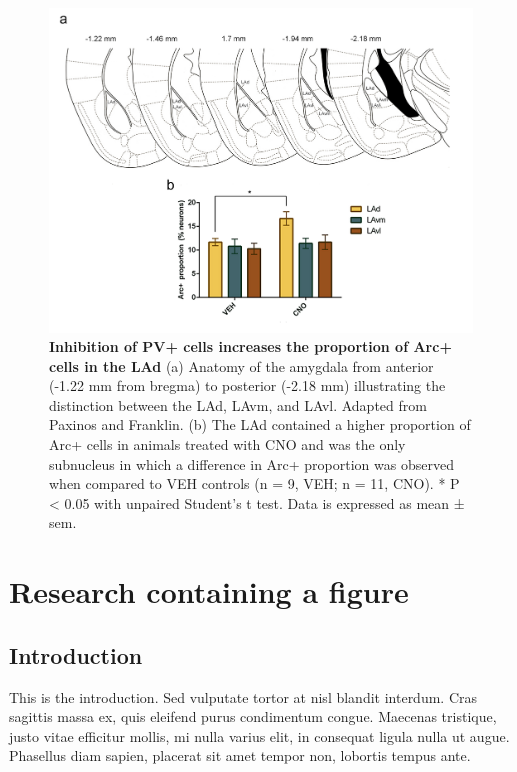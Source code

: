 \documentclass[12pt,a4paperpaper,]{report}
\begin{document}
\begin{figure}[htbp]
\centering
\includegraphics{source/figures/figure_5.jpg}
\caption{\textbf{Inhibition of PV+ cells increases the proportion of
Arc+ cells in the LAd} (a) Anatomy of the amygdala from anterior (-1.22
mm from bregma) to posterior (-2.18 mm) illustrating the distinction
between the LAd, LAvm, and LAvl. Adapted from Paxinos and Franklin. (b)
The LAd contained a higher proportion of Arc+ cells in animals treated
with CNO and was the only subnucleus in which a difference in Arc+
proportion was observed when compared to VEH controls (n = 9, VEH; n =
11, CNO). * P \textless{} 0.05 with unpaired Student's t test. Data is
expressed as mean ± sem. \label{ref_a_figure}}
\end{figure}

\chapter{Research containing a
figure}\label{research-containing-a-figure}

\section{Introduction}\label{introduction-3}

This is the introduction. Sed vulputate tortor at nisl blandit interdum.
Cras sagittis massa ex, quis eleifend purus condimentum congue. Maecenas
tristique, justo vitae efficitur mollis, mi nulla varius elit, in
consequat ligula nulla ut augue. Phasellus diam sapien, placerat sit
amet tempor non, lobortis tempus ante.
\end{document}
